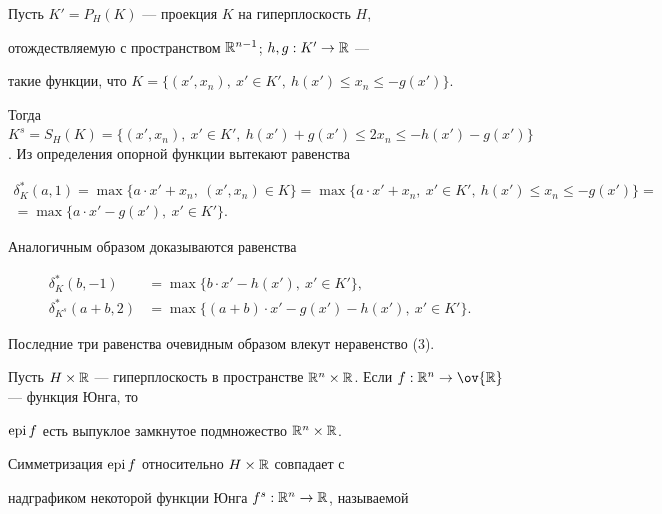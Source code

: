  


\begin{pf} 


Пусть $K'=P_H(K)$ --- проекция $K$ на гиперплоскость $H$, 


отождествляемую с пространством $\Bbb R^{n-1}$; $h,g:K'\to\Bbb R$ --- 


такие функции, что $K=\{(x',x_n),\ x'\in K',\ h(x')\le x_n\le-g(x')\}$. 


Тогда $K^s=S_H(K)=\{(x',x_n),\ x'\in K',\ h(x')+g(x')\le 2x_n\le 


-h(x')-g(x')\}$. Из определения опорной функции вытекают равенства 


\begin{multline*} 


\delta^*_K(a,1)=\max\{a\cdot x'+x_n,\ (x',x_n)\in K\}= 


\max\{a\cdot x'+x_n,\ x'\in K',\ h(x')\le x_n\le -g(x')\}= \\


=\max\{a\cdot x'-g(x'),\ x'\in K'\}. 


\end{multline*}  


Аналогичным образом доказываются равенства 


\begin{align*} 


\delta^*_K(b,-1)&=\max\{b\cdot x'-h(x'),\ x'\in K'\}, \\ 


\delta^*_{K^s}(a+b,2)&=\max\{(a+b)\cdot x'-g(x')-h(x'), 


\ x'\in K'\}. 


\end{align*} 


Последние три равенства очевидным образом влекут неравенство (3). 


\end{pf} 


 


Пусть $H\times\Bbb R$ --- гиперплоскость в пространстве $\Bbb 


R^n\times\Bbb R$. Если $f:\Bbb R^n\to\ov{\Bbb R}$ --- функция Юнга, то 


$\operatorname{epi} f$ есть выпуклое замкнутое подмножество $\Bbb R^n\times\Bbb R$. 


Симметризация $\operatorname{epi} f$ относительно $H\times\Bbb R$ совпадает с 


надграфиком некоторой функции Юнга $f^s:\Bbb R^n\to\Bbb R$, называемой 


